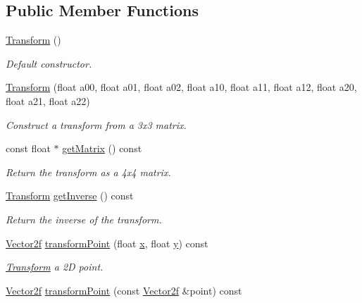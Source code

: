 \subsection*{Public Member Functions}
\begin{DoxyCompactItemize}
\item 
\hyperlink{classsf_1_1_transform_ac32de51bd0b9f3d52fbe0838225ee83b}{Transform} ()
\begin{DoxyCompactList}\small\item\em Default constructor. \end{DoxyCompactList}\item 
\hyperlink{classsf_1_1_transform_a78c48677712fcf41122d02f1301d71a3}{Transform} (float a00, float a01, float a02, float a10, float a11, float a12, float a20, float a21, float a22)
\begin{DoxyCompactList}\small\item\em Construct a transform from a 3x3 matrix. \end{DoxyCompactList}\item 
const float $\ast$ \hyperlink{classsf_1_1_transform_ae4c1969c47533e2b01deb526ff73b37f}{get\-Matrix} () const 
\begin{DoxyCompactList}\small\item\em Return the transform as a 4x4 matrix. \end{DoxyCompactList}\item 
\hyperlink{classsf_1_1_transform}{Transform} \hyperlink{classsf_1_1_transform_ab1c033198b0aae8cdb9daa3d3bef3fc1}{get\-Inverse} () const 
\begin{DoxyCompactList}\small\item\em Return the inverse of the transform. \end{DoxyCompactList}\item 
\hyperlink{namespacesf_acf03098c2577b869e2fa6836cc48f1a0}{Vector2f} \hyperlink{classsf_1_1_transform_af20913c6a27087c26192c116397ab40a}{transform\-Point} (float \hyperlink{gl3_8h_a92d0386e5c19fb81ea88c9f99644ab1d}{x}, float \hyperlink{gl3_8h_a66ddd433d2cacfe27f5906b7e86faeed}{y}) const 
\begin{DoxyCompactList}\small\item\em \hyperlink{classsf_1_1_transform}{Transform} a 2\-D point. \end{DoxyCompactList}\item 
\hyperlink{namespacesf_acf03098c2577b869e2fa6836cc48f1a0}{Vector2f} \hyperlink{classsf_1_1_transform_ac322cd8f6d606598d1aacc4d1d160ad6}{transform\-Point} (const \hyperlink{namespacesf_acf03098c2577b869e2fa6836cc48f1a0}{Vector2f} \&point) const 

\end{DoxyCompactItemize}

